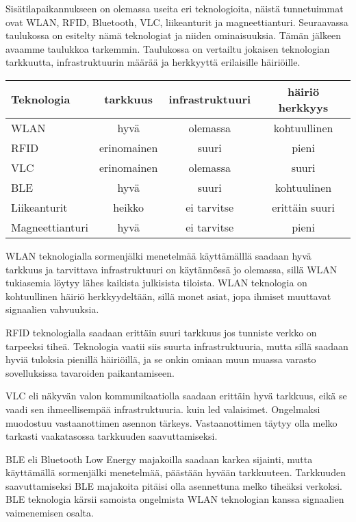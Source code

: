 Sisätilapaikannukseen on olemassa useita eri teknologioita, näistä tunnetuimmat ovat WLAN, RFID, Bluetooth, VLC, liikeanturit ja magneettianturi. Seuraavassa taulukossa on esitelty nämä teknologiat ja niiden ominaisuuksia. Tämän jälkeen avaamme taulukkoa tarkemmin. Taulukossa on vertailtu jokaisen teknologian tarkkuutta, infrastruktuurin määrää ja herkkyyttä erilaisille häiriöille.
\begin{center}
\begin{tabular}{| l || c | c | c| }
\hline
Teknologia & tarkkuus & infrastruktuuri & häiriö herkkyys\\ \hline\hline
WLAN & hyvä & olemassa & kohtuullinen\\ \hline
RFID & erinomainen & suuri & pieni\\ \hline
VLC & erinomainen & olemassa & suuri\\ \hline
BLE & hyvä & suuri & kohtuulinen\\ \hline
Liikeanturit & heikko & ei tarvitse & erittäin suuri\\ \hline
Magneettianturi & hyvä & ei tarvitse & pieni\\
\hline
\end{tabular}
\end{center}

WLAN teknologialla sormenjälki menetelmää käyttämälllä saadaan hyvä tarkkuus ja tarvittava infrastruktuuri on käytännössä jo olemassa, sillä WLAN tukiasemia löytyy lähes kaikista julkisista tiloista. WLAN teknologia on kohtuullinen häiriö herkkyydeltään, sillä monet asiat, jopa ihmiset muuttavat signaalien vahvuuksia.

RFID teknologialla saadaan erittäin suuri tarkkuus jos tunniste verkko on tarpeeksi tiheä. Teknologia vaatii siis suurta infrastruktuuria, mutta sillä saadaan hyviä tuloksia pienillä häiriöillä, ja se onkin omiaan muun muassa varasto sovelluksissa tavaroiden paikantamiseen.

VLC eli näkyvän valon kommunikaatiolla saadaan erittäin hyvä tarkkuus, eikä se vaadi sen ihmeellisempää infrastruktuuria. kuin led valaisimet. Ongelmaksi muodostuu vastaanottimen asennon tärkeys. Vastaanottimen täytyy olla melko tarkasti vaakatasossa tarkkuuden saavuttamiseksi.

BLE eli Bluetooth Low Energy majakoilla saadaan karkea sijainti, mutta käyttämällä sormenjälki menetelmää, päästään hyvään tarkkuuteen. Tarkkuuden saavuttamiseksi BLE majakoita pitäisi olla asennettuna melko tiheäksi verkoksi. BLE teknologia kärsii samoista ongelmista WLAN teknologian kanssa signaalien vaimenemisen osalta.

